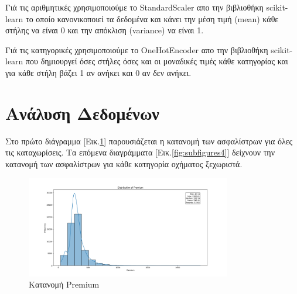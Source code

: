 \documentclass{llncs}
\begin{document}
Γιά τις αριθμητικές χρησιμοποιούμε το StandardScaler απο την βιβλιοθήκη scikit-learn το 
οποίο κανονικοποιεί τα δεδομένα και κάνει την μέση τιμή (mean) κάθε στήλης να είναι 0 και
την απόκλιση (variance) να είναι 1.

Γιά τις κατηγορικές χρησιμοποιούμε το OneHotEncoder απο την βιβλιοθήκη scikit-learn 
που δημιουργεί όσες στήλες όσες και οι μοναδικές τιμές κάθε κατηγορίας και για κάθε στήλη 
βάζει 1 αν ανήκει και 0 αν δεν ανήκει.

\section{Ανάλυση Δεδομένων}
Στο πρώτο διάγραμμα [Εικ.\ref{fig:prem}] παρουσιάζεται η κατανομή των ασφαλίστρων για όλες τις καταχωρίσεις. Τα επόμενα διαγράμματα [Εικ.\ref{fig:subfigures4}] δείχνουν την κατανομή των ασφαλίστρων για κάθε κατηγορία οχήματος ξεχωριστά.
\begin{figure}
    \begin{center}
        \includegraphics[width=0.8\textwidth]{images/premium.png}
    \end{center}
    \caption{Κατανομή Premium} 
    \label{fig:prem}   
\end{figure}
\end{document}
